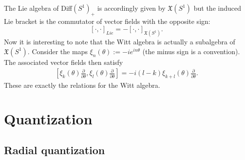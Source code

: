 	The Lie algebra of Diff$(S^1)_+$ is accordingly given by $\mathfrak{X}(S^1)$ but the induced Lie bracket is the commutator of vector fields with the opposite sign: \[[\cdot, \cdot]_{Lie} = -[\cdot, \cdot]_{\mathfrak{X}(S^1)}.\] Now it is interesting to note that the Witt algebra is actually a subalgebra of $\mathfrak{X}(S^1)$. Consider the maps $\xi_n(\theta):=-ie^{in\theta}$ (the minus sign is a convention). The associated vector fields then satisfy
	\begin{gather}
		\left[\xi_k(\theta)\frac{\partial}{\partial\theta}, \xi_l(\theta)\frac{\partial}{\partial\theta}\right] = -i(l-k)\xi_{k+l}(\theta)\frac{\partial}{\partial\theta}.
	\end{gather}
	These are exactly the relations for the Witt algebra.

\section{Quantization}

	
\subsection{Radial quantization}

